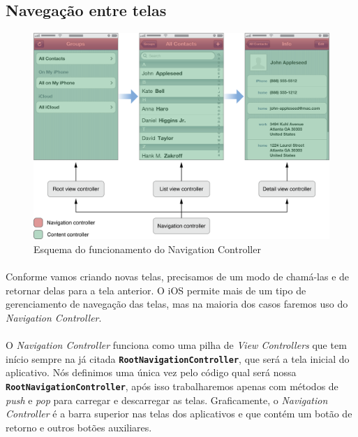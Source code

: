 \documentclass[a4paper,12pt,brazil,doubleside]{book}
\begin{document}
\begin{singlespace}
\bigskip

\subsection{Navegação entre telas}

\begin{figure}[h]
  \centering
  \includegraphics[totalheight=0.35\textheight]{figuras/apple_navigation_interface.png}
  \caption{Esquema do funcionamento do Navigation Controller}
  \label{fig:a}
\end{figure}

\paragraph{}Conforme vamos criando novas telas, precisamos de um modo de chamá-las e de retornar delas para a tela anterior. O iOS permite mais de um tipo de gerenciamento de navegação das telas, mas na maioria dos casos faremos uso do \emph{Navigation Controller}.
\paragraph{}O \emph{Navigation Controller} funciona como uma pilha de \emph{View Controllers} que tem início sempre na já citada \texttt{\textbf{RootNavigationController}}, que será a tela inicial do aplicativo. Nós definimos uma única vez pelo código qual será nossa \texttt{\textbf{RootNavigationController}}, após isso trabalharemos apenas com métodos de \emph{push} e \emph{pop} para carregar e descarregar as telas. Graficamente, o \emph{Navigation Controller} é a barra superior nas telas dos aplicativos e que contém um botão de retorno e outros botões auxiliares.

\end{singlespace}
\end{document}
